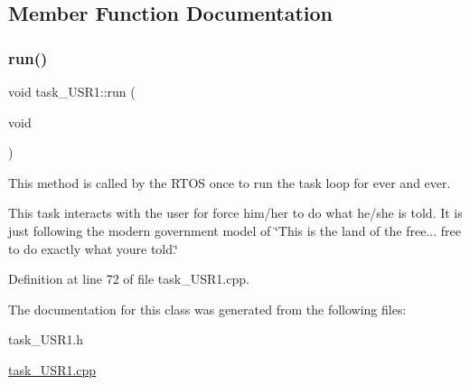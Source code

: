 \subsection{Member Function Documentation}
\mbox{\label{classtask__USR1_a95b84a7b7f293a56470b74eb541fe346}} 
\subsubsection{\texorpdfstring{run()}{run()}}
{\footnotesize\ttfamily void task\+\_\+\+U\+S\+R1\+::run (\begin{DoxyParamCaption}\item[{void}]{ }\end{DoxyParamCaption})}

This method is called by the R\+T\+OS once to run the task loop for ever and ever.

This task interacts with the user for force him/her to do what he/she is told. It is just following the modern government model of \char`\"{}\+This is the land of the free...
free to do exactly what you\textquotesingle{}re told.\char`\"{} 

Definition at line 72 of file task\+\_\+\+U\+S\+R1.\+cpp.



The documentation for this class was generated from the following files\+:\begin{DoxyCompactItemize}
\item 
task\+\_\+\+U\+S\+R1.\+h\item 
\mbox{\hyperlink{task__USR1_8cpp}{task\+\_\+\+U\+S\+R1.\+cpp}}\end{DoxyCompactItemize}
